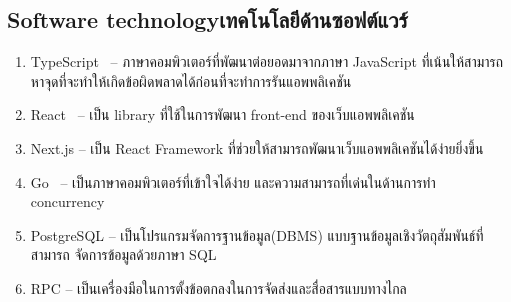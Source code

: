 \subsection{\ifenglish Software technology\else เทคโนโลยีด้านซอฟต์แวร์\fi}
\begin{enumerate}
    \item TypeScript~\cite{typescript} -- ภาษาคอมพิวเตอร์ที่พัฒนาต่อยอดมาจากภาษา JavaScript
          ที่เน้นให้สามารถหาจุดที่จะทำให้เกิดข้อผิดพลาดได้ก่อนที่จะทำการรันแอพพลิเคชัน
    \item React~\cite{react} -- เป็น library ที่ใช้ในการพัฒนา front-end ของเว็บแอพพลิเคชัน
    \item Next.js\cite{nextjs} -- เป็น React Framework ที่ช่วยให้สามารถพัฒนาเว็บแอพพลิเคชันได้ง่ายยิ่งขึ้น
    \item Go~\cite{golang} -- เป็นภาษาคอมพิวเตอร์ที่เข้าใจได้ง่าย และความสามารถที่เด่นในด้านการทำ concurrency
    \item PostgreSQL -- เป็นโปรแกรมจัดการฐานข้อมูล(DBMS) แบบฐานข้อมูลเชิงวัตถุสัมพันธ์ที่สามารถ จัดการข้อมูลด้วยภาษา SQL
    \item RPC -- เป็นเครื่องมือในการตั้งข้อตกลงในการจัดส่งและสื่อสารแบบทางไกล
\end{enumerate}



